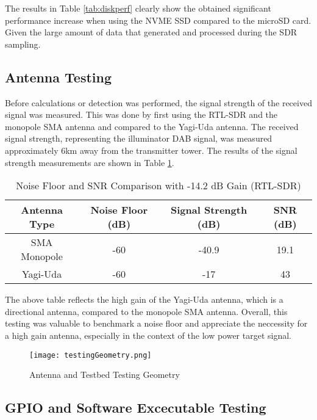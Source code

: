 The results in Table \ref{tab:diskperf} clearly show the obtained significant performance increase when using the NVME SSD compared to the microSD card. Given the large amount of data that generated and processed during the SDR sampling. 

\subsection{Antenna Testing \label{sec:antennaVerification}}

Before calculations or detection was performed, the signal strength of the received signal was measured. This was done by first using the RTL-SDR and the monopole SMA antenna and compared to the Yagi-Uda antenna. The received signal strength, representing the illuminator DAB signal, was measured approximately 6km away from the transmitter tower. The results of the signal strength measurements are shown in Table \ref{tab:signalstrength}.

\begin{table}[h!]
    \centering
    \caption{Noise Floor and SNR Comparison with -14.2 dB Gain (RTL-SDR)}
    \label{tab:signalstrength}
    \begin{tabular}{|c|c|c|c|}
        \hline
        \textbf{Antenna Type} & \textbf{Noise Floor (dB)} & \textbf{Signal Strength (dB)} & \textbf{SNR (dB)} \\ \hline
        SMA Monopole & -60 & -40.9 & 19.1 \\ \hline
        Yagi-Uda     & -60 & -17   & 43   \\ \hline
    \end{tabular}
    \vspace{0.5cm}
\end{table}

The above table reflects the high gain of the Yagi-Uda antenna, which is a directional antenna, compared to the monopole SMA antenna. Overall, this testing was valuable to benchmark a noise floor and appreciate the neccessity for a high gain antenna, especially in the context of the low power target signal.

\begin{figure}[h!]
    \centering
    \texttt{[image: testingGeometry.png]}
    \caption{Antenna and Testbed Testing Geometry}
    \label{fig:antennaGeometry}
\end{figure}


\subsection{GPIO and Software Excecutable Testing \label{sec:gpioTesting}}

